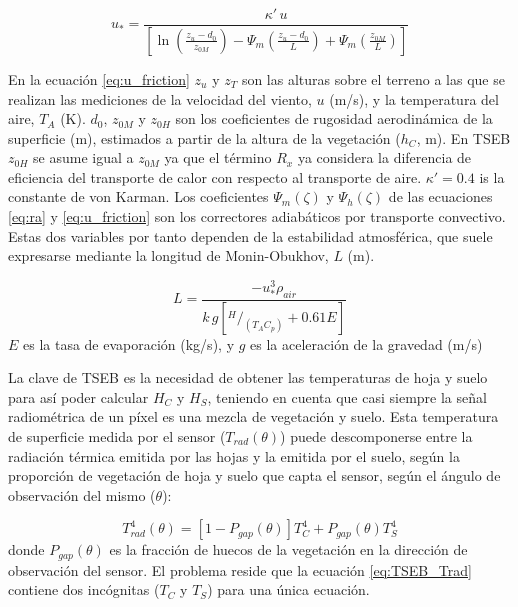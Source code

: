 \documentclass[a4paper,11pt]{article}
\begin{document}
  \begin{equation}\label{eq:u_friction}
   u_{*}=\frac{\kappa '\,u}{\left[\ln\left(\frac{z_{u}-d_0}{z_{0M}}\right)-\Psi_{m} \left(\frac{z_{u}-d_0}{L}\right)+\Psi_m\left(\frac{z_{0M}}{L}\right)\right]}
  \end{equation}

  En la ecuación \ref{eq:u_friction} $z_{u}$ y $z_{T}$ son las alturas sobre el terreno a las que se realizan las mediciones de la velocidad del viento, $u$ (m/s), y la temperatura del aire, $T_{A}$ (K). $d_0$, $z_{0M}$ y $z_{0H}$ son los coeficientes de rugosidad aerodinámica de la superficie (m), estimados a partir de la altura de la vegetación ($h_C$, m). En TSEB $z_{0H}$ se asume igual a $z_{0M}$ ya que el término $R_x$ ya considera la diferencia de eficiencia del transporte de calor con respecto al transporte de aire. $\kappa '=0.4$ is la constante de von Karman. Los coeficientes $\Psi_{m}\left(\zeta\right)$ y $\Psi_{h}\left(\zeta\right)$ de las ecuaciones \ref{eq:ra} y \ref{eq:u_friction} son los correctores adiabáticos por transporte convectivo. Estas dos variables por tanto dependen de la estabilidad atmosférica, que suele expresarse mediante la longitud de Monin-Obukhov, $L$ (m).

  \begin{equation}\label{eq:MO}
   L=\frac{-u_{*}^{3}\rho_{air}}{k\,g\left[^H/_{\left(T_{A}C_{p}\right)} +0.61E\right]}
  \end{equation}
  $E$ es la tasa de evaporación (kg/s), y $g$ es la aceleración de la gravedad (m/s)

  La clave de TSEB es la necesidad de obtener las temperaturas de hoja y suelo para así poder calcular $H_C$ y $H_S$, teniendo en cuenta que casi siempre la señal radiométrica de un píxel es una mezcla de vegetación y suelo. Esta temperatura de superficie medida por el sensor ($T_{rad}\left(\theta\right)$) puede descomponerse entre la radiación térmica emitida por las hojas y la emitida por el suelo, según la proporción de vegetación de hoja y suelo que capta el sensor, según el ángulo de observación del mismo ($\theta$):

  \begin{equation}\label{eq:TSEB_Trad}
   T_{rad}^4\left(\theta\right)=\left[1-P_{gap}\left(\theta\right)\right]T_{C}^4 + P_{gap}\left(\theta\right)T_{S}^4
  \end{equation}
  donde $P_{gap}\left(\theta\right)$ es la fracción de huecos de la vegetación en la dirección de observación del sensor. El problema reside que la ecuación \ref{eq:TSEB_Trad} contiene dos incógnitas ($T_C$ y $T_S$) para una única ecuación.
  
\end{document}
